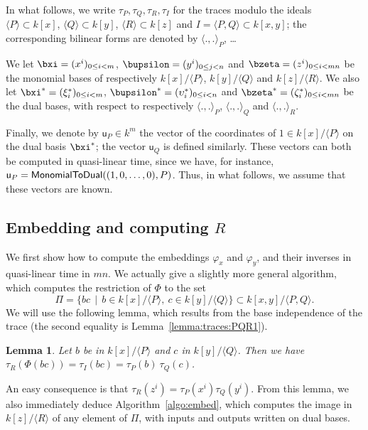 \documentclass{sig-alternate}
\def\vu {\ensuremath{\mathsf{u}}}
\newcounter{algo}
\newcommand{\ang}[1]{\langle#1\rangle}
\newtheorem{Lemma}{Lemma}
\begin{document}
In what follows, we write $\tau_P,\tau_Q,\tau_R,\tau_I$ for the traces
modulo the ideals $\ang{P}\subset k[x]$, $\ang{Q} \subset k[y]$,
$\ang{R} \subset k[z]$ and $I=\ang{P,Q} \subset k[x,y]$; the
corresponding bilinear forms are denoted by $\ang{.,.}_P$, \dots

We let $\bxi=(x^i)_{0 \le i < m}$, $\bupsilon=(y^i)_{0 \le j <
  n}$ and $\bzeta = (z^i)_{0 \le i < mn}$ be the monomial bases of
respectively $k[x]/\ang{P}$, $k[y]/\ang{Q}$ and $k[z]/\ang{R}$. We also let
$\bxi^\ast=(\xi^\ast_i)_{0 \le i <m}$,
$\bupsilon^\ast=(\upsilon^\ast_i)_{0 \le i < n}$ and
$\bzeta^\ast=(\zeta^\ast_i)_{0 \le i < mn}$ be the dual bases, with
respect to respectively $\ang{.,.}_P$, $\ang{.,.}_Q$ and
$\ang{.,.}_R$.

Finally, we denote by $\vu_P \in k^m$ the vector of the coordinates of
$1 \in k[x]/\ang{P}$ on the dual basis $\bxi^\ast$; the vector
$\vu_Q$ is defined similarly. These vectors can both be computed in
quasi-linear time, since we have, for instance, $\vu_P = {\sf
  MonomialToDual}((1,0,\dots,0), P)$. Thus, in what follows, we assume
that these vectors are known.


\subsection{Embedding and computing $R$} 

We first show how to compute the embeddings $\varphi_x$ and
$\varphi_y$, and their inverses in quasi-linear time in $mn$. We
actually give a slightly more general algorithm, which computes the
restriction of $\Phi$ to the set $$\Pi= \{bc \,\mid\, b\in
k[x]/\ang{P},\ c\in k[y]/\ang{Q}\} \subset k[x,y]/\ang{P,Q}.$$ We
will use the following lemma, which results from the base independence
of the trace (the second equality is Lemma~\ref{lemma:traces:PQR1}).

\begin{Lemma}
  \label{lemma:traces:PQR}
  Let $b$ be in $k[x]/\ang{P}$ and $c$ in $k[y]/\ang{Q}$. Then we have
  $\tau_R(\Phi(bc)) = \tau_I(bc) = \tau_P(b) \ \tau_Q(c)$.
\end{Lemma}
An easy consequence is that $\tau_R(z^i) =
\tau_P(x^i)\tau_Q(y^i)$. From this lemma, we also immediately deduce
Algorithm~\ref{algo:embed}, which computes the image in $k[z]/\ang{R}$
of any element of $\Pi$, with inputs and outputs written on dual
bases.

\vspace{-2ex}
\end{document}
